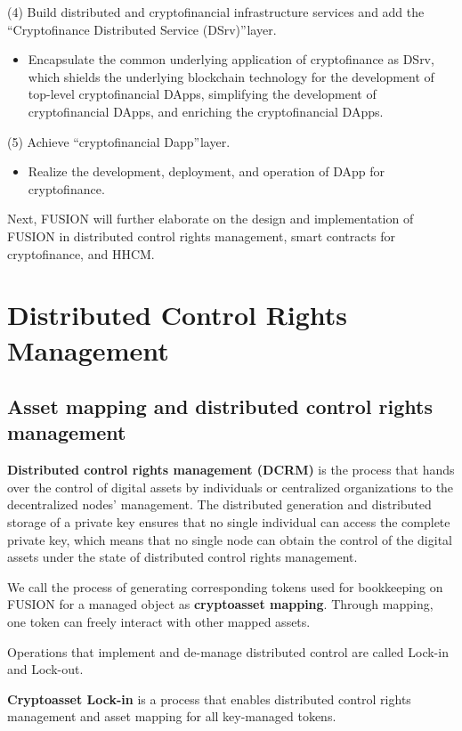 \documentclass[a4paper,12pt]{article}
\begin{document}
(4) Build distributed and cryptofinancial infrastructure services and add the “Cryptofinance Distributed Service (DSrv)” layer.
\begin{itemize} [itemindent = 1em]
\item Encapsulate the common underlying application of cryptofinance as DSrv, which shields the underlying blockchain technology for the development of top-level cryptofinancial DApps, simplifying the development of cryptofinancial DApps, and enriching the cryptofinancial DApps.
\end{itemize}

(5) Achieve “cryptofinancial Dapp” layer.
\begin{itemize} [itemindent = 1em]
\item Realize the development, deployment, and operation of DApp for cryptofinance.
\end{itemize}

Next, FUSION will further elaborate on the design and implementation of FUSION in distributed control rights management, smart contracts for cryptofinance, and HHCM.

\section{Distributed Control Rights Management}
\subsection{Asset mapping and distributed control rights management}
{\bfseries{Distributed control rights management (DCRM)}} is the process that hands over the control of digital assets by individuals or centralized organizations to the decentralized nodes' management. The distributed generation and distributed storage of a private key ensures that no single individual can access the complete private key, which means that no single node can obtain the control of the digital assets under the state of distributed control rights management.

We call the process of generating corresponding tokens used for bookkeeping on FUSION for a managed object as {\bfseries {cryptoasset mapping}}. Through mapping, one token can freely interact with other mapped assets.

Operations that implement and de-manage distributed control are called Lock-in and Lock-out.

\textbf{Cryptoasset Lock-in} is a process that enables distributed control rights management and asset mapping for all key-managed tokens.
\end{document}
